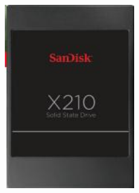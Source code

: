 \documentclass{article}
\begin{document}
\href{https://www.mouser.com/datasheet/2/669/SanDisk_DataSheet_X210_08_06_13-805929.pdf}{\includegraphics[height=8cm]{SSD.jpg}} 
\end{document}
